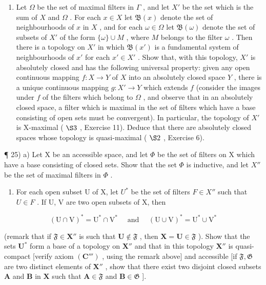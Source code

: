\begin{enumerate}
\def\labelenumi{\alph{enumi})}
\setcounter{enumi}{1}
\tightlist
\item
  Let \(\Omega\) be the set of maximal filters in \(\Gamma\) , and let \(X'\) be the set which is the sum of \(X\) and \(\Omega\) . For each \(x \in X\) let \(\mathfrak{B}(x)\) denote the set of neighbourhoods of \(x\) in \(X\) , and for each \(\omega \in \Omega\) let \(\mathfrak{B}(\omega)\) denote the set of subsets of \(X'\) of the form \(\{\omega\} \cup M\) , where \(M\) belongs to the filter \(\omega\) . Then there is a topology on \(X'\) in which \(\mathfrak{B}(x')\) is a fundamental system of neighbourhoods of \(x'\) for each \(x' \in X'\) . Show that, with this topology, \(X'\) is absolutely closed and has the following universal property: given any open continuous mapping \(f: X \to Y\) of \(X\) into an absolutely closed space \(Y\) , there is a unique continuous mapping \(g: X' \to Y\) which extends \(f\) (consider the images under \(f\) of the filters which belong to \(\Omega\) , and observe that in an absolutely closed space, a filter which is maximal in the set of filters which have a base consisting of open sets must be convergent). In particular, the topology of \(X'\) is X-maximal ( \(\S 3\) , Exercise 11). Deduce that there are absolutely closed spaces whose topology is quasi-maximal ( \(\S 2\) , Exercise 6).
\end{enumerate}

¶ 25) a) Let X be an accessible space, and let \(\Phi\) be the set of filters on X which have a base consisting of closed sets. Show that the set \(\Phi\) is inductive, and let \(X''\) be the set of maximal filters in \(\Phi\) .

\begin{enumerate}
\def\labelenumi{\alph{enumi})}
\setcounter{enumi}{1}
\tightlist
\item
  For each open subset U of X, let \(U^{*}\) be the set of filters \(F \in X''\) such that \(U \in F\) . If U, V are two open subsets of X, then
\end{enumerate}

\[
(\mathrm{U} \cap \mathrm{V}) ^ {*} = \mathrm{U} ^ {*} \cap \mathrm{V} ^ {*} \quad \text { and } \quad (\mathrm{U} \cup \mathrm{V}) ^ {*} = \mathrm{U} ^ {*} \cup \mathrm{V} ^ {*}
\]

(remark that if \(\mathfrak{F} \in \mathbf{X}''\) is such that \(\mathbf{U} \notin \mathfrak{F}\) , then \(\mathbf{X} = \mathbf{U} \in \mathfrak{F}\) ). Show that the sets \(\mathbf{U}^*\) form a base of a topology on \(\mathbf{X}''\) and that in this topology \(\mathbf{X}''\) is quasi-compact {[}verify axiom \((\mathbf{C}''')\) , using the remark above{]} and accessible {[}if \(\mathfrak{F}, \mathfrak{G}\) are two distinct elements of \(\mathbf{X}''\) , show that there exist two disjoint closed subsets \(\mathbf{A}\) and \(\mathbf{B}\) in \(\mathbf{X}\) such that \(\mathbf{A} \in \mathfrak{F}\) and \(\mathbf{B} \in \mathfrak{G}\) {]}.

